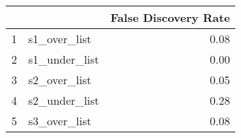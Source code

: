 \begin{tabular}{rlr}
  \hline
 &  & False Discovery Rate \\ 
  \hline
1 & s1\_over\_list & 0.08 \\ 
  2 & s1\_under\_list & 0.00 \\ 
  3 & s2\_over\_list & 0.05 \\ 
  4 & s2\_under\_list & 0.28 \\ 
  5 & s3\_over\_list & 0.08 \\ 
   \hline
\end{tabular}
